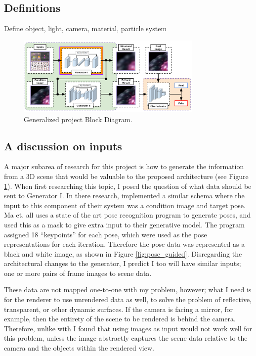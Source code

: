 \documentclass[conference]{IEEEtran}
\begin{document}
\subsection{Definitions}
Define object, light, camera, material, particle system

\begin{figure}[htbp]
\centerline{\includegraphics[width=9cm]{block_diagram.png}}
\caption{Generalized project Block Diagram.}
\label{fig:block_diagram}
\end{figure}


\subsection{A discussion on inputs}
\label{subsec:inputs}
A major subarea of research for this project is how to generate the
information from a 3D scene that would be valuable to the proposed architecture
(see Figure \ref{fig:block_diagram}).
When first researching this topic, I posed the question of what
data should be sent to Generator I.
In there research, \cite{ref:pose_guided} implemented a similar schema where the input to this
component of their system was a condition image and target pose.
Ma et. all uses a state of the art pose recognition program to
generate poses, and used this as a mask to give extra input to their generative model.
The program assigned 18 ``keypoints'' for each pose,
which were used as the pose representations for each iteration.
Therefore the pose data was represented as a black and white image,
as shown in Figure \ref{fig:pose_guided}.
Disregarding the architectural changes to the generator, I predict I too will
have similar inputs; one or more pairs of frame images to scene data.

These data are not mapped one-to-one with my problem, however;
what I need is for the renderer to use unrendered data as well,
to solve the problem of reflective, transparent, or other dynamic surfaces.
If the camera is facing a mirror, for example,
then the entirety of the scene to be rendered is behind the camera.
Therefore, unlike with \cite{ref:pose_guided}
I found that using images as input would not work well for this problem,
unless the image abstractly captures the scene data relative to the camera and
the objects within the rendered view.
\end{document}
